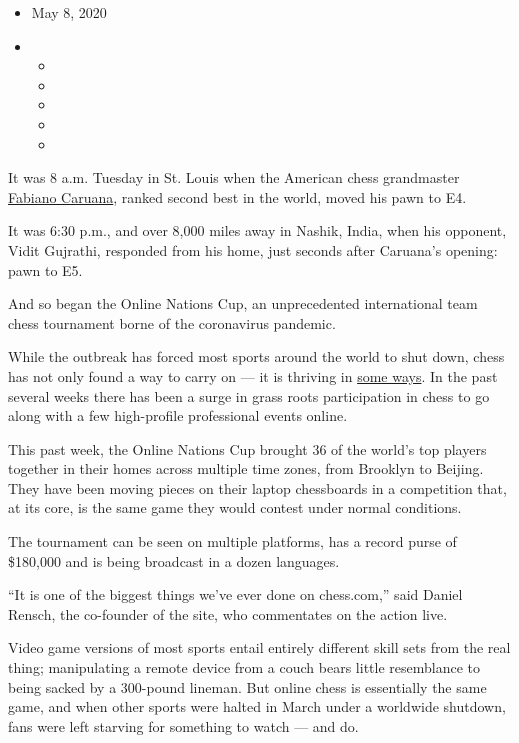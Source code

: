 \begin{itemize}
\item
  May 8, 2020
\item
  \begin{itemize}
  \item
  \item
  \item
  \item
  \item
  \end{itemize}
\end{itemize}

It was 8 a.m. Tuesday in St. Louis when the American chess grandmaster
\href{https://www.nytimes3xbfgragh.onion/2018/11/03/sports/bobby-fischer-chess-caruana.html}{Fabiano
Caruana}, ranked second best in the world, moved his pawn to E4.

It was 6:30 p.m., and over 8,000 miles away in Nashik, India, when his
opponent, Vidit Gujrathi, responded from his home, just seconds after
Caruana's opening: pawn to E5.

And so began the Online Nations Cup, an unprecedented international team
chess tournament borne of the coronavirus pandemic.

While the outbreak has forced most sports around the world to shut down,
chess has not only found a way to carry on --- it is thriving in
\href{https://www.nytimes3xbfgragh.onion/2020/04/14/well/family/coronavirus-quarantine-board-games-videoconferencing.html}{some
ways}. In the past several weeks there has been a surge in grass roots
participation in chess to go along with a few high-profile professional
events online.

This past week, the Online Nations Cup brought 36 of the world's top
players together in their homes across multiple time zones, from
Brooklyn to Beijing. They have been moving pieces on their laptop
chessboards in a competition that, at its core, is the same game they
would contest under normal conditions.

The tournament can be seen on multiple platforms, has a record purse of
\$180,000 and is being broadcast in a dozen languages.

``It is one of the biggest things we've ever done on chess.com,'' said
Daniel Rensch, the co-founder of the site, who commentates on the action
live.

Video game versions of most sports entail entirely different skill sets
from the real thing; manipulating a remote device from a couch bears
little resemblance to being sacked by a 300-pound lineman. But online
chess is essentially the same game, and when other sports were halted in
March under a worldwide shutdown, fans were left starving for something
to watch --- and do.

